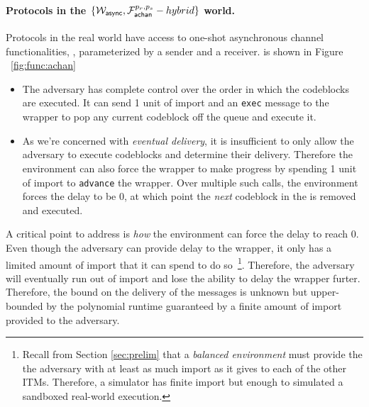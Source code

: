 \paragraph{Protocols in the $\{\mathcal{W}_{{\mathsf {async}}}, \mathcal{F}_{{\mathsf {achan}}}^{p_r,p_s}-hybrid\}$ world.}
Protocols in the real world have access to one-shot asynchronous channel functionalities, \achan, parameterized by a sender and a receiver.
\achan is shown in Figure ~\ref{fig:func:achan}


\begin{itemize}
\item The adversary has complete control over the order in which the codeblocks are executed. 
It can send 1 unit of import and an \texttt{exec} message to the wrapper to pop any current codeblock off the queue and execute it. 
\item As we're concerned with {\em eventual delivery}, it is insufficient to only allow the adversary to execute codeblocks and determine their delivery. 
Therefore the environment can also force the wrapper to make progress by spending 1 unit of import to \texttt{advance} the wrapper.
Over multiple such calls, the environment forces the delay to be 0, at which point the {\em next} codeblock in the  is removed and executed.
\end{itemize}

A critical point to address is {\em how} the environment can force the delay to reach 0.
Even though the adversary can provide delay to the wrapper, it only has a limited amount of import that it can spend to do so~\footnote{Recall from Section \ref{sec:prelim} that a {\em balanced environment} must provide the the adversary with at least as much import as it gives to each of the other ITMs. Therefore, a simulator has finite import but enough to simulated a sandboxed real-world execution.}.
Therefore, the adversary will eventually run out of import and lose the ability to delay the wrapper furter.
Therefore, the bound on the delivery of the messages is unknown but upper-bounded by the polynomial runtime guaranteed by a finite amount of import provided to the adversary.



